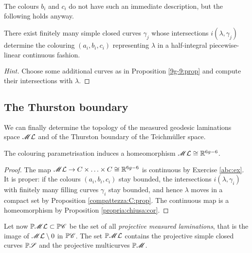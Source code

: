 The colours $b_i$ and $c_i$ do not have such an immediate description, but the following holds anyway.

\begin{ex} \label{abc:ex}
There exist finitely many simple closed curves $\gamma_j$ whose intersections $i(\lambda, \gamma_j)$ determine the colouring $(a_i,b_i,c_i)$ representing $\lambda$ in a half-integral piecewise-linear continuous fashion.
\end{ex}
\begin{proof}[Hint] Choose some additional curves as in Proposition \ref{9g-9:prop} 
and compute their intersections with $\lambda$.
\end{proof}

\subsection{The Thurston boundary}
We can finally determine the topology of the measured geodesic laminations space $\mathscr{M}\mathcal{L}$ and of the Thurston boundary of the Teichm\"uller space.

\begin{prop}
The colouring parametrisation induces a homeomorphism $\mathscr{M}\mathcal{L} \cong \mathbb{R}^{6g-6}$.
\end{prop}
\begin{proof}
The map $\mathscr{M}\mathcal{L} \to C\times \ldots \times C \cong \mathbb{R}^{6g-6}$ is continuous by Exercise \ref{abc:ex}. It is proper: if the colours $(a_i,b_i,c_i)$ stay bounded, the intersections $i(\lambda, \gamma_i)$ with finitely many filling curves $\gamma_i$ stay bounded, and hence $\lambda$ moves in a compact set by Proposition \ref{compattezza:C:prop}. The continuous map is a homeomorphism by Proposition \ref{propria:chiusa:cor}.
\end{proof} 

Let now $\mathbb{P}\mathscr{M}\mathcal{L} \subset \mathbb{P}\mathscr{C}$ be the set of all \emph{projective measured laminations}, that is the image of $\mathscr{M}\mathcal{L}\setminus 0$ in $\mathbb{P}\mathscr{C}$. The set $\mathbb{P}\mathscr{M}\mathcal{L}$ contains the projective simple closed curves $\mathbb{P}\mathscr{S}$ and the projective multicurves $\mathbb{P}\mathscr{M}$.

